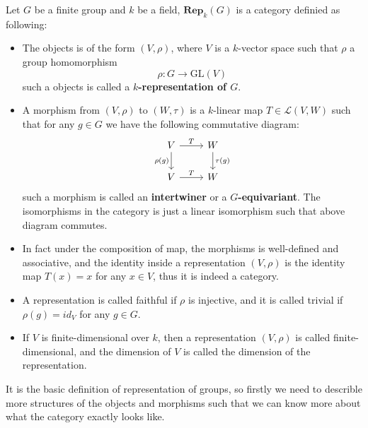 \begin{definition}
    Let \(G\) be a finite group and \(k\) be a field, \(\mathbf{Rep}_k(G)\) is a category definied as following:
\begin{itemize}
    \item The objects is of the form \((V,\rho)\), where \(V\) is a \(k\)-vector space such that \(\rho\) a group homomorphism 
    \[\rho : G \to \mathrm{GL}(V)\]
    such a objects is called a \textbf{\(k\)-representation of \(G\)}.

    \item A morphism from \((V,\rho)\) to \((W,\tau)\) is a \(k\)-linear map \(T \in \mathcal{L}(V,W)\) such that for any \(g \in G\) we have the following commutative diagram:
\[\begin{tikzcd}
	V & W \\
	V & W
	\arrow["T", from=1-1, to=1-2]
	\arrow["{\rho(g)}"', from=1-1, to=2-1]
	\arrow["{\tau(g)}", from=1-2, to=2-2]
	\arrow["T", from=2-1, to=2-2]
\end{tikzcd}\]
    such a morphism is called an \textbf{intertwiner} or a \textbf{\(G\)-equivariant}. The isomorphisms in the category is just a linear isomorphism such that above diagram commutes.

    \item In fact under the composition of map, the morphisms is well-defined and associative, and the identity inside a representation \((V,\rho)\) is the identity map \(T(x) = x\) for any \(x \in V\), thus it is indeed a category.
    
    \item A representation is called faithful if \(\rho\) is injective, and it is called trivial if \(\rho(g) = id_V\) for any \(g \in G\).
    
    \item If \(V\) is finite-dimensional over \(k\), then a representation \((V,\rho)\) is called finite-dimensional, and the dimension of \(V\) is called the dimension of the representation.


\end{itemize}
\end{definition}

It is the basic definition of representation of groups, so firstly we need to describle more structures of the objects and morphisms such that we can know more about what the category exactly looks like.


